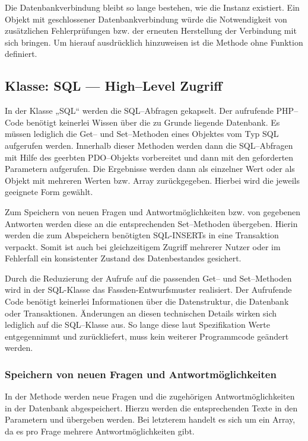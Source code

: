 Die Datenbankverbindung bleibt so lange bestehen, wie die Instanz existiert. Ein Objekt mit geschlossener Datenbankverbindung würde die Notwendigkeit von zusätzlichen Fehlerprüfungen bzw. der erneuten Herstellung der Verbindung mit sich bringen. Um hierauf ausdrücklich hinzuweisen ist die Methode  ohne Funktion definiert.
 
\subsection{Klasse: SQL --- High--Level Zugriff}

In der Klasse „SQL“ werden die SQL--Abfragen gekapselt. Der aufrufende PHP--Code benötigt keinerlei Wissen über die zu Grunde liegende Datenbank. Es müssen lediglich die Get-- und Set--Methoden eines Objektes vom Typ SQL aufgerufen werden. Innerhalb dieser Methoden werden dann die SQL--Abfragen mit Hilfe des geerbten PDO--Objekts vorbereitet und dann mit den geforderten Parametern aufgerufen. Die Ergebnisse werden dann als einzelner Wert oder als Objekt mit mehreren Werten bzw. Array zurückgegeben. Hierbei wird die jeweils geeignete Form gewählt.

Zum Speichern von neuen Fragen und Antwortmöglichkeiten bzw. von gegebenen Antworten werden diese an die entsprechenden Set--Methoden übergeben. Hierin werden die zum Abspeichern benötigten SQL-INSERTs in eine Transaktion verpackt. Somit ist auch bei gleichzeitigem Zugriff mehrerer Nutzer oder im Fehlerfall ein konsistenter Zustand des Datenbestandes gesichert.

Durch die Reduzierung der Aufrufe auf die passenden Get-- und Set--Methoden wird in der SQL-Klasse das Fassden-Entwurfsmuster realisiert. Der Aufrufende Code benötigt keinerlei Informationen über die Datenstruktur, die Datenbank oder Transaktionen. Änderungen an diesen technischen Details wirken sich lediglich auf die SQL--Klasse aus. So lange diese laut Spezifikation Werte entgegennimmt und zurückliefert, muss kein weiterer Programmcode geändert werden.

\subsubsection{Speichern von neuen Fragen und Antwortmöglichkeiten}

In der Methode  werden neue Fragen und die zugehörigen Antwortmöglichkeiten in der Datenbank abgespeichert. Hierzu werden die entsprechenden Texte in den Parametern  und  übergeben werden. Bei letzterem handelt es sich um ein Array, da es pro Frage mehrere Antwortmöglichkeiten gibt.

